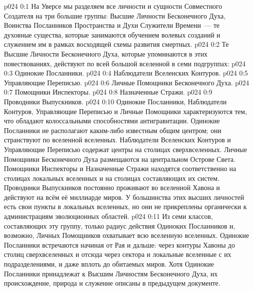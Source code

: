 \author{Божественный Советник}
\vs p024 0:1 На Уверсе мы разделяем все личности и сущности Совместного Создателя на три большие группы: Высшие Личности Бесконечного Духа, Воинства Посланников Пространства и Духи Служители Времени~--- те духовные существа, которые занимаются обучением волевых созданий и служением им в рамках восходящей схемы развития смертных.
\vs p024 0:2 \pc Те Высшие Личности Бесконечного Духа, которые упоминаются в этих повествованиях, действуют по всей большой вселенной в семи подгруппах:
\vs p024 0:3 Одинокие Посланники.
\vs p024 0:4 Наблюдатели Вселенских Контуров.
\vs p024 0:5 Управляющие Переписью.
\vs p024 0:6 Личные Помощники Бесконечного Духа.
\vs p024 0:7 Помощники Инспекторы.
\vs p024 0:8 Назначенные Стражи.
\vs p024 0:9 Проводники Выпускников.
\vs p024 0:10 \pc Одинокие Посланники, Наблюдатели Контуров, Управляющие Переписью и Личные Помощники характеризуются тем, что обладают колоссальными способностями антигравитации. Одинокие Посланники не располагают каким\hyp{}либо известным общим центром; они странствуют по вселенной вселенных. Наблюдатели Вселенских Контуров и Управляющие Переписью содержат центры на столицах сверхвселенных. Личные Помощники Бесконечного Духа размещаются на центральном Острове Света. Помощники Инспекторы и Назначенные Стражи находятся соответственно на столицах локальных вселенных и на столицах составляющих их систем. Проводники Выпускников постоянно проживают во вселенной Хавона и действуют на всём её миллиарде миров. У большинства этих высших личностей есть свои пункты в локальных вселенных, но они не прикреплены органически к администрациям эволюционных областей.
\vs p024 0:11 Из семи классов, составляющих эту группу, только радиус действия Одиноких Посланников и, возможно, Личных Помощников охватывает всю вселенную вселенных. Одинокие Посланники встречаются начиная от Рая и дальше: через контуры Хавоны до столиц сверхвселенных и отсюда через сектора и локальные вселенные с их подразделениями, и даже вплоть до обитаемых миров. Хотя Одинокие Посланники принадлежат к Высшим Личностям Бесконечного Духа, их происхождение, природа и служение описаны в предыдущем документе.
